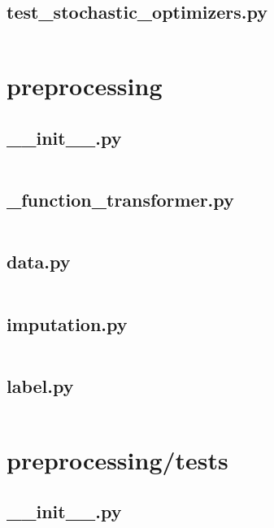 \documentclass{article}
\begin{document}
\subsection{test\_stochastic\_optimizers.py}
\inputminted{python}{/home/dufferzafar/dev/@clones/scikit-learn/sklearn/neural_network/tests/test_stochastic_optimizers.py}
\newpage

\section{preprocessing}

\subsection{\_\_init\_\_.py}
\inputminted{python}{/home/dufferzafar/dev/@clones/scikit-learn/sklearn/preprocessing/__init__.py}
\newpage

\subsection{\_function\_transformer.py}
\inputminted{python}{/home/dufferzafar/dev/@clones/scikit-learn/sklearn/preprocessing/_function_transformer.py}
\newpage

\subsection{data.py}
\inputminted{python}{/home/dufferzafar/dev/@clones/scikit-learn/sklearn/preprocessing/data.py}
\newpage

\subsection{imputation.py}
\inputminted{python}{/home/dufferzafar/dev/@clones/scikit-learn/sklearn/preprocessing/imputation.py}
\newpage

\subsection{label.py}
\inputminted{python}{/home/dufferzafar/dev/@clones/scikit-learn/sklearn/preprocessing/label.py}
\newpage

\section{preprocessing/tests}

\subsection{\_\_init\_\_.py}
\inputminted{python}{/home/dufferzafar/dev/@clones/scikit-learn/sklearn/preprocessing/tests/__init__.py}
\newpage
\end{document}

